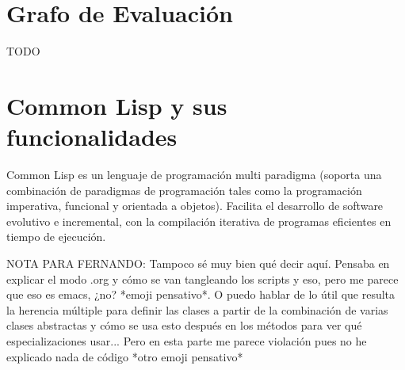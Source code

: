 \section{Grafo de Evaluación}\label{2-JJ}
TODO

\section{Common Lisp y sus funcionalidades}\label{2-Lisp}
Common Lisp es un lenguaje de programación multi paradigma (soporta una combinación de paradigmas de programación tales como la programación imperativa, funcional y orientada a objetos). Facilita el desarrollo de software evolutivo e incremental, con la compilación iterativa de programas eficientes en tiempo de ejecución.

NOTA PARA FERNANDO: Tampoco sé muy bien qué decir aquí. Pensaba en explicar el modo .org y cómo se van tangleando los scripts y eso, pero me parece que eso es emacs, ¿no? *emoji pensativo*. O puedo hablar de lo útil que resulta la herencia múltiple para definir las clases a partir de la combinación de varias clases abstractas y cómo se usa esto después en los métodos para ver qué especializaciones usar... Pero en esta parte me parece violación pues no he explicado nada de código *otro emoji pensativo*




























